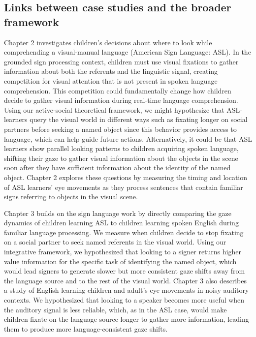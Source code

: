 \documentclass[oneside]{report}
\begin{document}
\subsection{Links between case studies and the broader
framework}\label{links-between-case-studies-and-the-broader-framework}

Chapter 2 investigates children's decisions about where to look while
comprehending a visual-manual language (American Sign Language: ASL). In
the grounded sign processing context, children must use visual fixations
to gather information about both the referents and the linguistic
signal, creating competition for visual attention that is not present in
spoken language comprehension. This competition could fundamentally
change how children decide to gather visual information during real-time
language comprehension. Using our active-social theoretical framework,
we might hypothesize that ASL-learners query the visual world in
different ways such as fixating longer on social partners before seeking
a named object since this behavior provides access to language, which
can help guide future actions. Alternatively, it could be that ASL
learners show parallel looking patterns to children acquiring spoken
language, shifting their gaze to gather visual information about the
objects in the scene soon after they have sufficient information about
the identity of the named object. Chapter 2 explores these questions by
measuring the timing and location of ASL learners' eye movements as they
process sentences that contain familiar signs referring to objects in
the visual scene.

Chapter 3 builds on the sign language work by directly comparing the
gaze dynamics of children learning ASL to children learning spoken
English during familiar language processing. We measure when children
decide to stop fixating on a social partner to seek named referents in
the visual world. Using our integrative framework, we hypothesized that
looking to a signer returns higher value information for the specific
task of identifying the named object, which would lead signers to
generate slower but more consistent gaze shifts away from the language
source and to the rest of the visual world. Chapter 3 also describes a
study of English-learning children and adult's eye movements in noisy
auditory contexts. We hypothesized that looking to a speaker becomes
more useful when the auditory signal is less reliable, which, as in the
ASL case, would make children fixate on the language source longer to
gather more information, leading them to produce more
language-consistent gaze shifts.
\end{document}
